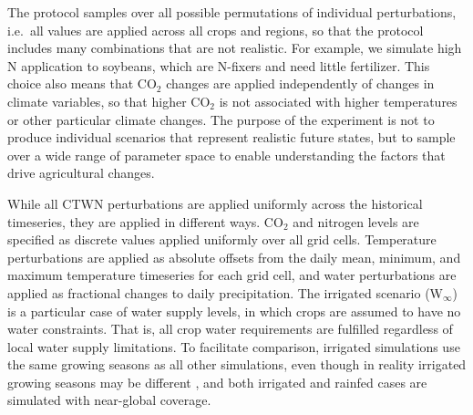 \documentclass[gmd, manuscript]{copernicus} %
\begin{document}
The protocol samples over all possible permutations of individual perturbations, i.e.\ all values are applied across all crops and regions, so that the protocol includes  many combinations that are not realistic.  For example, we simulate high N application to soybeans, which are N-fixers and need little fertilizer. %
This choice also means that CO$_2$ changes are applied independently of changes in climate variables, so that higher CO$_2$ is not associated with higher temperatures or other particular climate changes. The purpose of the experiment is not to produce individual scenarios that represent realistic future states, but to sample over a wide range of parameter space to enable understanding the factors that drive agricultural changes. 

While all CTWN perturbations are applied uniformly across the historical timeseries, they are applied in different ways. 
CO$_2$ and nitrogen levels are specified as discrete values applied uniformly over all grid cells.
Temperature perturbations are applied as absolute offsets from the daily mean, minimum, and maximum temperature timeseries for each grid cell, and 
water perturbations are applied as fractional changes to daily precipitation. 
The irrigated scenario (W$_{\infty}$) is a particular case of water supply levels, in which crops are assumed to have no water constraints. That is, all crop water requirements are fulfilled regardless of local water supply limitations.
 To facilitate comparison, irrigated simulations use the same growing seasons as all other simulations, even though in reality irrigated growing seasons may be different \citep{Portmann2010}, and both irrigated and rainfed cases  
 are simulated with near-global coverage. %
\end{document}
